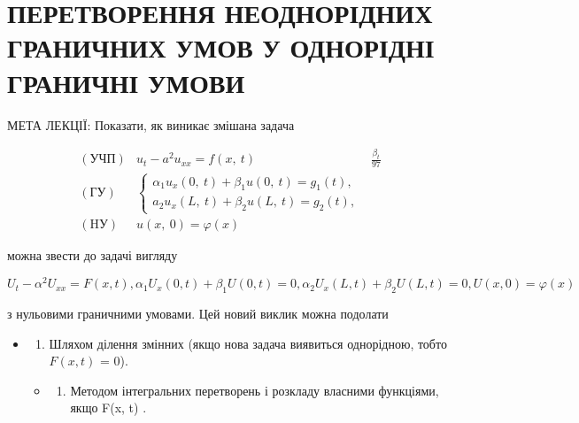 \documentclass[
  ukrainian,
]{article}
\providecommand{\tightlist}{%
  \setlength{\itemsep}{0pt}\setlength{\parskip}{0pt}}
\begin{document}
\section{ПЕРЕТВОРЕННЯ НЕОДНОРІДНИХ ГРАНИЧНИХ УМОВ У ОДНОРІДНІ ГРАНИЧНІ
УМОВИ}\label{ux43fux435ux440ux435ux442ux432ux43eux440ux435ux43dux43dux44f-ux43dux435ux43eux434ux43dux43eux440ux456ux434ux43dux438ux445-ux433ux440ux430ux43dux438ux447ux43dux438ux445-ux443ux43cux43eux432-ux443-ux43eux434ux43dux43eux440ux456ux434ux43dux456-ux433ux440ux430ux43dux438ux447ux43dux456-ux443ux43cux43eux432ux438}

МЕТА ЛЕКЦІЇ: Показати, як виникає змішана задача

\[
\begin{aligned} (\text{УЧП}) & u_t - a^2 u_{xx} = f\left(x, \ t\right) & \frac{\beta_t}{97} \\ (\text{ГУ}) & \begin{cases} \alpha_1 u_x\left(0, \ t\right) + \beta_1 u\left(0, \ t\right) = g_1\left(t\right), \\ a_2 u_x\left(L, \ t\right) + \beta_2 u\left(L, \ t\right) = g_2\left(t\right), \end{cases} \\ (\text{HУ}) & u\left(x, \ 0\right) = \varphi\left(x\right) \end{aligned}
\]

можна звести до задачі вигляду

\[
U_{t} - \alpha^{2}U_{xx} = F(x, t),
\alpha_{1}U_{x}(0, t) + \beta_{1}U(0, t) = 0,
\alpha_{2}U_{x}(L, t) + \beta_{2}U(L, t) = 0,
U(x, 0) = \varphi(x)
\]

з нульовими граничними умовами. Цей новий виклик можна подолати

\begin{itemize}
\item
  \begin{enumerate}
  \def\labelenumi{\arabic{enumi}.}
  \tightlist
  \item
    Шляхом ділення змінних (якщо нова задача виявиться однорідною, тобто
    \(F(x, t)\) = 0).
  \end{enumerate}

  \begin{itemize}
  \tightlist
  \item
    \begin{enumerate}
    \def\labelenumi{\arabic{enumi}.}
    \setcounter{enumi}{1}
    \tightlist
    \item
      Методом інтегральних перетворень і розкладу власними функціями,
      якщо F(x, t)  .
    \end{enumerate}
  \end{itemize}
\end{itemize}
\end{document}
